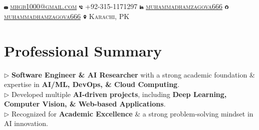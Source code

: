 \documentclass[]{resume-openfont}
\begin{document}
\newcommand{\yourName}{Muhammad Hamza}
\newcommand{\yourAddress}{Karachi, PK}
\newcommand{\yourEmail}{mhgb1000@gmail.com}
\newcommand{\yourPhone}{+92-315-1171297}
\newcommand{\githubUserName}{muhammadhamzagova666}
\newcommand{\linkedInUserName}{muhammadhamzagova666}

\begin{center}
    \Huge \scshape \latoRegular{\yourName} \\ 
    \Large \scshape {} \\ \vspace{1pt}
    \small \includegraphics[width=0.015\textwidth]{PNGs/mail.png} \href{mailto:\yourEmail}{\yourEmail} \textbullet{} \includegraphics[width=0.015\textwidth]{PNGs/phone.png} \yourPhone \textbullet{} \includegraphics[width=0.015\textwidth]{PNGs/linkedin.png} \href{https://www.linkedin.com/in/\linkedInUserName}{\linkedInUserName} \textbullet{} \includegraphics[width=0.015\textwidth]{PNGs/github.png} \href{https://github.com/\githubUserName}{\githubUserName} \textbullet{} \includegraphics[width=0.015\textwidth]{PNGs/address.png} \yourAddress
\end{center}

\section{Professional Summary}
$\triangleright$ \textbf{Software Engineer \& AI Researcher} with a strong academic foundation \& expertise in \textbf{AI/ML, DevOps, \& Cloud Computing}.\\
$\triangleright$ Developed multiple \textbf{AI-driven projects}, including \textbf{Deep Learning, Computer Vision, \& Web-based Applications}.\\
$\triangleright$ Recognized for \textbf{Academic Excellence} \& a strong problem-solving mindset in AI innovation.\\
\end{document}

